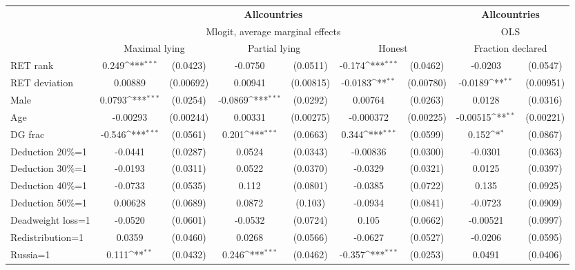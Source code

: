 \def\sym#1{\ifmmode^{#1}\else\(^{#1}\)\fi}
\begin{tabular}{l|cccccc|cc}
\hline\hline
&\multicolumn{6}{c|}{\bf All\space{}countries}&\multicolumn{2}{c}{\bf All\space{}countries}\\ &\multicolumn{6}{c|}{Mlogit, average marginal effects }&\multicolumn{2}{c}{OLS}\\
                &\multicolumn{2}{c}{Maximal lying}&\multicolumn{2}{c}{Partial lying}&\multicolumn{2}{c}{Honest}  &\multicolumn{2}{c}{Fraction declared}\\
\hline
RET rank        &    0.249\sym{***}& (0.0423)&  -0.0750         & (0.0511)&   -0.174\sym{***}& (0.0462)&  -0.0203         & (0.0547)\\
RET deviation   &  0.00889         &(0.00692)&  0.00941         &(0.00815)&  -0.0183\sym{**} &(0.00780)&  -0.0189\sym{**} &(0.00951)\\
Male            &   0.0793\sym{***}& (0.0254)&  -0.0869\sym{***}& (0.0292)&  0.00764         & (0.0263)&   0.0128         & (0.0316)\\
Age             & -0.00293         &(0.00244)&  0.00331         &(0.00275)&-0.000372         &(0.00225)& -0.00515\sym{**} &(0.00221)\\
DG frac         &   -0.546\sym{***}& (0.0561)&    0.201\sym{***}& (0.0663)&    0.344\sym{***}& (0.0599)&    0.152\sym{*}  & (0.0867)\\
Deduction 20\%=1&  -0.0441         & (0.0287)&   0.0524         & (0.0343)& -0.00836         & (0.0300)&  -0.0301         & (0.0363)\\
Deduction 30\%=1&  -0.0193         & (0.0311)&   0.0522         & (0.0370)&  -0.0329         & (0.0321)&   0.0125         & (0.0397)\\
Deduction 40\%=1&  -0.0733         & (0.0535)&    0.112         & (0.0801)&  -0.0385         & (0.0722)&    0.135         & (0.0925)\\
Deduction 50\%=1&  0.00628         & (0.0689)&   0.0872         &  (0.103)&  -0.0934         & (0.0841)&  -0.0723         & (0.0909)\\
Deadweight loss=1&  -0.0520         & (0.0601)&  -0.0532         & (0.0724)&    0.105         & (0.0662)& -0.00521         & (0.0997)\\
Redistribution=1&   0.0359         & (0.0460)&   0.0268         & (0.0566)&  -0.0627         & (0.0527)&  -0.0206         & (0.0595)\\
Russia=1        &    0.111\sym{**} & (0.0432)&    0.246\sym{***}& (0.0462)&   -0.357\sym{***}& (0.0253)&   0.0491         & (0.0406)\\

\end{tabular}
